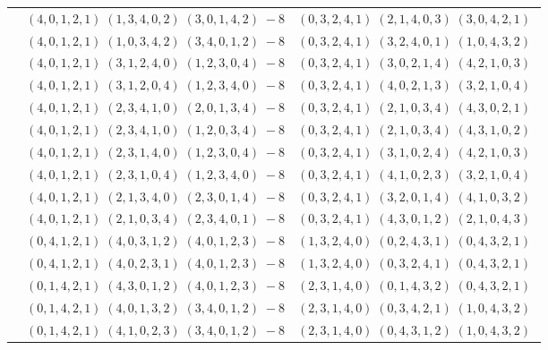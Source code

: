 \documentclass[11pt]{article}
\begin{document}
\begin{longtable}[l]{|c|c|c|}
 \cline{2-3} 
 & $(4 ,0 ,1 ,2 ,1) \;(1 ,3 ,4 ,0 ,2) \;(3 ,0 ,1 ,4 ,2) \;-8$ & $(0 ,3 ,2 ,4 ,1) \;(2 ,1 ,4 ,0 ,3) \;(3 ,0 ,4 ,2 ,1) \;$\\ 
 \cline{2-3} 
 & $(4 ,0 ,1 ,2 ,1) \;(1 ,0 ,3 ,4 ,2) \;(3 ,4 ,0 ,1 ,2) \;-8$ & $(0 ,3 ,2 ,4 ,1) \;(3 ,2 ,4 ,0 ,1) \;(1 ,0 ,4 ,3 ,2) \;$\\ 
 \cline{2-3} 
 & $(4 ,0 ,1 ,2 ,1) \;(3 ,1 ,2 ,4 ,0) \;(1 ,2 ,3 ,0 ,4) \;-8$ & $(0 ,3 ,2 ,4 ,1) \;(3 ,0 ,2 ,1 ,4) \;(4 ,2 ,1 ,0 ,3) \;$\\ 
 \cline{2-3} 
 & $(4 ,0 ,1 ,2 ,1) \;(3 ,1 ,2 ,0 ,4) \;(1 ,2 ,3 ,4 ,0) \;-8$ & $(0 ,3 ,2 ,4 ,1) \;(4 ,0 ,2 ,1 ,3) \;(3 ,2 ,1 ,0 ,4) \;$\\ 
 \cline{2-3} 
 & $(4 ,0 ,1 ,2 ,1) \;(2 ,3 ,4 ,1 ,0) \;(2 ,0 ,1 ,3 ,4) \;-8$ & $(0 ,3 ,2 ,4 ,1) \;(2 ,1 ,0 ,3 ,4) \;(4 ,3 ,0 ,2 ,1) \;$\\ 
 \cline{2-3} 
 & $(4 ,0 ,1 ,2 ,1) \;(2 ,3 ,4 ,1 ,0) \;(1 ,2 ,0 ,3 ,4) \;-8$ & $(0 ,3 ,2 ,4 ,1) \;(2 ,1 ,0 ,3 ,4) \;(4 ,3 ,1 ,0 ,2) \;$\\ 
 \cline{2-3} 
 & $(4 ,0 ,1 ,2 ,1) \;(2 ,3 ,1 ,4 ,0) \;(1 ,2 ,3 ,0 ,4) \;-8$ & $(0 ,3 ,2 ,4 ,1) \;(3 ,1 ,0 ,2 ,4) \;(4 ,2 ,1 ,0 ,3) \;$\\ 
 \cline{2-3} 
 & $(4 ,0 ,1 ,2 ,1) \;(2 ,3 ,1 ,0 ,4) \;(1 ,2 ,3 ,4 ,0) \;-8$ & $(0 ,3 ,2 ,4 ,1) \;(4 ,1 ,0 ,2 ,3) \;(3 ,2 ,1 ,0 ,4) \;$\\ 
 \cline{2-3} 
 & $(4 ,0 ,1 ,2 ,1) \;(2 ,1 ,3 ,4 ,0) \;(2 ,3 ,0 ,1 ,4) \;-8$ & $(0 ,3 ,2 ,4 ,1) \;(3 ,2 ,0 ,1 ,4) \;(4 ,1 ,0 ,3 ,2) \;$\\ 
 \cline{2-3} 
 & $(4 ,0 ,1 ,2 ,1) \;(2 ,1 ,0 ,3 ,4) \;(2 ,3 ,4 ,0 ,1) \;-8$ & $(0 ,3 ,2 ,4 ,1) \;(4 ,3 ,0 ,1 ,2) \;(2 ,1 ,0 ,4 ,3) \;$\\ 
 \cline{2-3} 
 & $(0 ,4 ,1 ,2 ,1) \;(4 ,0 ,3 ,1 ,2) \;(4 ,0 ,1 ,2 ,3) \;-8$ & $(1 ,3 ,2 ,4 ,0) \;(0 ,2 ,4 ,3 ,1) \;(0 ,4 ,3 ,2 ,1) \;$\\ 
 \cline{2-3} 
 & $(0 ,4 ,1 ,2 ,1) \;(4 ,0 ,2 ,3 ,1) \;(4 ,0 ,1 ,2 ,3) \;-8$ & $(1 ,3 ,2 ,4 ,0) \;(0 ,3 ,2 ,4 ,1) \;(0 ,4 ,3 ,2 ,1) \;$\\ 
 \cline{2-3} 
 & $(0 ,1 ,4 ,2 ,1) \;(4 ,3 ,0 ,1 ,2) \;(4 ,0 ,1 ,2 ,3) \;-8$ & $(2 ,3 ,1 ,4 ,0) \;(0 ,1 ,4 ,3 ,2) \;(0 ,4 ,3 ,2 ,1) \;$\\ 
 \cline{2-3} 
 & $(0 ,1 ,4 ,2 ,1) \;(4 ,0 ,1 ,3 ,2) \;(3 ,4 ,0 ,1 ,2) \;-8$ & $(2 ,3 ,1 ,4 ,0) \;(0 ,3 ,4 ,2 ,1) \;(1 ,0 ,4 ,3 ,2) \;$\\ 
 \cline{2-3} 
 & $(0 ,1 ,4 ,2 ,1) \;(4 ,1 ,0 ,2 ,3) \;(3 ,4 ,0 ,1 ,2) \;-8$ & $(2 ,3 ,1 ,4 ,0) \;(0 ,4 ,3 ,1 ,2) \;(1 ,0 ,4 ,3 ,2) \;$\\ 

\end{longtable}
\end{document}
